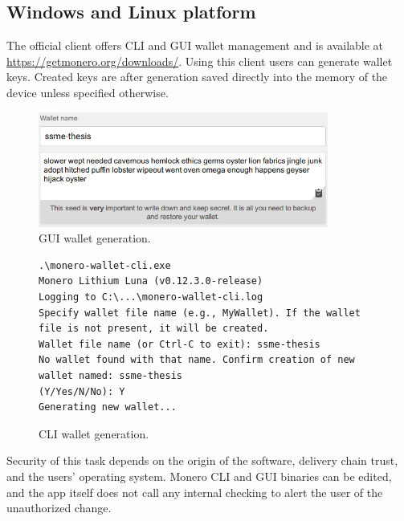 \documentclass[
  printed, %
  table,   %
  lof,     %
  lot,     %
           oneside, color
]{fithesis3}
\begin{document}
\subsection{Windows and Linux platform}
The official client offers CLI and GUI wallet management and is available at \url{https://getmonero.org/downloads/}. Using this client users can generate wallet keys. Created keys are after generation saved directly into the memory of the device unless specified otherwise. 
\begin{figure}[H]
\begin{center}
 \includegraphics[trim={0 0 0 0},clip,width=0.85\textwidth]{Screenshot_4.png}
    \caption{GUI wallet generation.}
    \label{pic:guigenerator}
\end{center}
    \end{figure}

\begin{figure}[H]
\begin{center}
\begin{lstlisting}
.\monero-wallet-cli.exe
Monero Lithium Luna (v0.12.3.0-release)
Logging to C:\...\monero-wallet-cli.log
Specify wallet file name (e.g., MyWallet). If the wallet 
file is not present, it will be created.
Wallet file name (or Ctrl-C to exit): ssme-thesis
No wallet found with that name. Confirm creation of new 
wallet named: ssme-thesis
(Y/Yes/N/No): Y
Generating new wallet...
\end{lstlisting}
\caption{CLI wallet generation.}
    \label{pic:cligenerator}
\end{center}
    \end{figure}
    \vspace{-1em}
Security of this task depends on the origin of the software, delivery chain trust, and the users' operating system. Monero CLI and GUI binaries can be edited, and the app itself does not call any internal checking to alert the user of the unauthorized change. 
\end{document}
